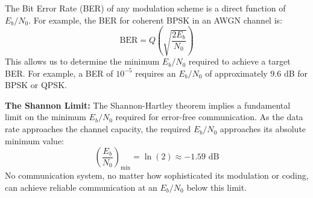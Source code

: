 The Bit Error Rate (BER) of any modulation scheme is a direct function of $E_b/N_0$. For example, the BER for coherent BPSK in an AWGN channel is:
\begin{equation}
    \text{BER} = Q\left(\sqrt{\frac{2E_b}{N_0}}\right)
\end{equation}
This allows us to determine the minimum $E_b/N_0$ required to achieve a target BER. For example, a BER of $10^{-5}$ requires an $E_b/N_0$ of approximately 9.6 dB for BPSK or QPSK.

\begin{warningbox}
    \textbf{The Shannon Limit:} The Shannon-Hartley theorem implies a fundamental limit on the minimum $E_b/N_0$ required for error-free communication. As the data rate approaches the channel capacity, the required $E_b/N_0$ approaches its absolute minimum value:
    \[ \left(\frac{E_b}{N_0}\right)_{\min} = \ln(2) \approx -1.59 \text{ dB} \]
    No communication system, no matter how sophisticated its modulation or coding, can achieve reliable communication at an $E_b/N_0$ below this limit.
\end{warningbox}


